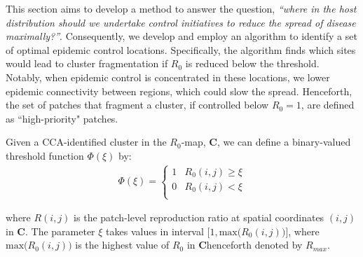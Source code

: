 This section aims to develop a method to answer the question, \textit{``where in the host distribution should we undertake control initiatives to reduce the spread of disease maximally?''}. Consequently, we develop and employ an algorithm to identify a set of optimal epidemic control locations. Specifically, the algorithm finds which sites would lead to cluster fragmentation if $R_0$ is reduced below the threshold. Notably, when epidemic control is concentrated in these locations, we lower epidemic connectivity between regions, which could slow the spread. Henceforth, the set of patches that fragment a cluster, if controlled below $R_0=1$, are defined as ``high-priority" patches.

Given a CCA-identified cluster in the $R_0$-map, $\mathbf{C}$, we can define a binary-valued threshold function $\Phi(\xi)$ by:
\begin{align}
\label{eq:xi-step}
\Phi(\xi) = \left\{ \begin{array}{cc} 
                1 & R_0(i, j) \geq \xi \\
                0 & R_0(i, j) < \xi \\
                \end{array} \right.
\end{align}

where $R(i,j)$ is the patch-level reproduction ratio at spatial coordinates $(i,j)$ in $\mathbf{C}$.
The parameter $\xi$ takes values in interval $\big[1, \mathrm{max}\big( R_0(i,j)\big) \big]$, 
where $\mathrm{max}\big(R_0(i, j)\big)$ is the highest value of $R_0$ in $\mathbf{C}$\textemdash henceforth denoted by $R_{max}$.

